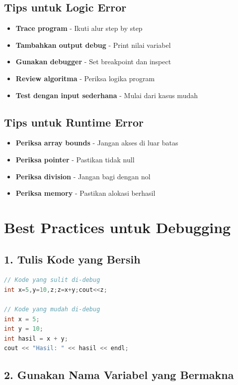 \subsection{Tips untuk Logic Error}

\begin{itemize}
\item \textbf{Trace program} - Ikuti alur step by step
\item \textbf{Tambahkan output debug} - Print nilai variabel
\item \textbf{Gunakan debugger} - Set breakpoint dan inspect
\item \textbf{Review algoritma} - Periksa logika program
\item \textbf{Test dengan input sederhana} - Mulai dari kasus mudah
\end{itemize}

\subsection{Tips untuk Runtime Error}

\begin{itemize}
\item \textbf{Periksa array bounds} - Jangan akses di luar batas
\item \textbf{Periksa pointer} - Pastikan tidak null
\item \textbf{Periksa division} - Jangan bagi dengan nol
\item \textbf{Periksa memory} - Pastikan alokasi berhasil
\end{itemize}

\section{Best Practices untuk Debugging}

\subsection{1. Tulis Kode yang Bersih}

\begin{lstlisting}[language=c++, caption=Kode yang Bersih]
// Kode yang sulit di-debug
int x=5,y=10,z;z=x+y;cout<<z;

// Kode yang mudah di-debug
int x = 5;
int y = 10;
int hasil = x + y;
cout << "Hasil: " << hasil << endl;
\end{lstlisting}

\subsection{2. Gunakan Nama Variabel yang Bermakna}


